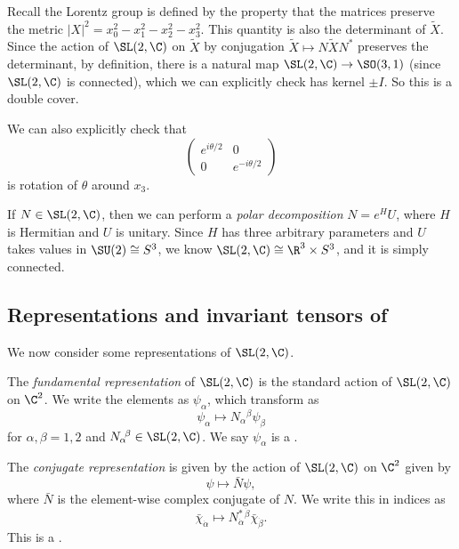 \documentclass[a4paper]{article}
\begin{document}
Recall the Lorentz group is defined by the property that the matrices preserve the metric $|X|^2 = x_0^2 - x_1^2 - x_2^2 - x_3^2$. This quantity is also the determinant of $\tilde{X}$. Since the action of $\SL(2, \C)$ on $\tilde{X}$ by conjugation $\tilde{X} \mapsto N \tilde{X} N^*$ preserves the determinant, by definition, there is a natural map $\SL(2, \C) \to \SO(3, 1)$ (since $\SL(2, \C)$ is connected), which we can explicitly check has kernel $\pm I$. So this is a double cover. %

We can also explicitly check that
\[
  \begin{pmatrix}
    e^{i\theta/2} & 0\\
    0 & e^{-i\theta/2}
  \end{pmatrix}
\]
is rotation of $\theta$ around $x_3$.

If $N \in \SL(2, \C)$, then we can perform a \emph{polar decomposition} $N = e^H U$, where $H$ is Hermitian and $U$ is unitary. Since $H$ has three arbitrary parameters and $U$ takes values in $\SU(2) \cong S^3$, we know $\SL(2, \C) \cong \R^3 \times S^3$, and it is simply connected. %

\subsection{Representations and invariant tensors of } %
We now consider some representations of $\SL(2, \C)$.
\begin{defi}
  The \emph{fundamental representation} of $\SL(2, \C)$ is the standard action of $\SL(2, \C)$ on $\C^2$. We write the elements as $\psi_\alpha$, which transform as
  \[
    \psi_\alpha \mapsto N_\alpha\!^\beta \psi_\beta
  \]
  for $\alpha, \beta = 1, 2$ and $N_\alpha\!^\beta \in \SL(2, \C)$. We say $\psi_\alpha$ is a .
\end{defi}

\begin{defi}
  The \emph{conjugate representation} is given by the action of $\SL(2, \C)$ on $\C^2$ given by
  \[
    \psi \mapsto \bar{N} \psi,
  \]
  where $\bar{N}$ is the element-wise complex conjugate of $N$. We write this in indices as
  \[
    \bar{\chi}_{\dot{\alpha}} \mapsto N^*_{\dot{\alpha}}\!^{\dot{\beta}} \bar{\chi}_{\dot{\beta}}.
  \]
  This is a .
\end{defi}
\end{document}
